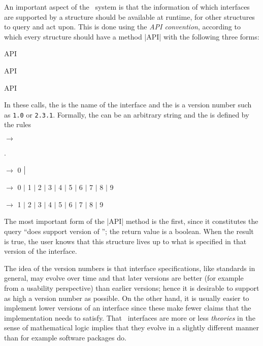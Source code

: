 \documentclass{mtmtcl}
\theoremstyle{plain}
\theoremstyle{remark}
\begin{document}
An important aspect of the \mtl\ system is that the information of 
which interfaces are supported by a structure should be available at 
runtime, for other structures to query and act upon. This is done 
using the \emph{API convention}, according to which every structure 
should have a method |API| with the following three forms:
\begin{displaysyntax}
   API  \par
   API \par
   API
\end{displaysyntax}
In these calls, the  is the name of the interface and 
the  is a version number such as \texttt{1.0} or 
\texttt{2.3.1}. Formally, the  can be an arbitrary 
string and the  is defined by the rules
\begin{displaysyntax}
   $\longrightarrow$ \relax
    \begin{regblock}[\regstar] . \end{regblock}
    \par
   $\longrightarrow$ 0 $\bigm\vert$ 
    \regstar\par
   $\longrightarrow$ 0 $\vert$ 1 $\vert$ 2 $\vert$ 3 
    $\vert$ 4 $\vert$ 5 $\vert$ 6 $\vert$ 7 $\vert$ 8 $\vert$ 9\par
   $\longrightarrow$ 1 $\vert$ 2 $\vert$ 3 
    $\vert$ 4 $\vert$ 5 $\vert$ 6 $\vert$ 7 $\vert$ 8 $\vert$ 9
\end{displaysyntax}
The most important form of the |API| method is the first, since it 
constitutes the query ``does  support version 
 of ''; the return value is a boolean. 
When the result is true, the user knows that this structure lives up 
to what is specified in that version of the interface.

The idea of the version numbers is that interface specifications, like 
standards in general, may evolve over time and that later versions 
are better (for example from a usability perspective) than earlier 
versions; hence it is desirable to support as high a version number 
as possible. On the other hand, it is usually easier to implement 
lower versions of an interface since these make fewer claims that the 
implementation needs to satisfy. That \mtl\ interfaces are more or less 
\emph{theories} in the sense of mathematical logic implies that they 
evolve in a slightly different manner than for example software 
packages do.
\end{document}
